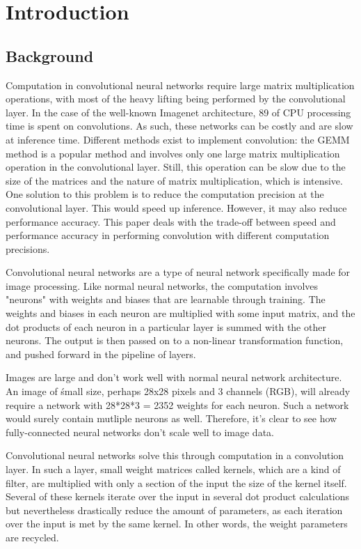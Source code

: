 \chapter{Introduction}

\section{Background}
    
Computation in convolutional neural networks require large matrix multiplication operations, with most of the heavy lifting being performed by the convolutional layer. In the case of the well-known Imagenet architecture, 89 of CPU processing time is spent on convolutions. As such, these networks can be costly and are slow at inference time. Different methods exist to implement convolution: the GEMM method is a popular method and involves only one large matrix multiplication operation in the convolutional layer. Still, this operation can be slow due to the size of the matrices and the nature of matrix multiplication, which is intensive. One solution to this problem is to reduce the computation precision at the convolutional layer. This would speed up inference. However, it may also reduce performance accuracy. This paper deals with the trade-off between speed and performance accuracy in performing convolution with different computation precisions.

Convolutional neural networks are a type of neural network specifically made for image processing. Like normal neural networks, the computation involves "neurons" with weights and biases that are learnable through training. The weights and biases in each neuron are multiplied with some input matrix, and the dot products of each neuron in a particular layer is summed with the other neurons. The output is then passed on to a non-linear transformation function, and pushed forward in the pipeline of layers.

Images are large and don't work well with normal neural network architecture. An image of śmall size, perhaps 28x28 pixels and 3 channels (RGB), will already require a network with 28*28*3 = 2352 weights for each neuron. Such a network would surely contain mutliple neurons as well. Therefore, it's clear to see how fully-connected neural networks don't scale well to image data.

Convolutional neural networks solve this through computation in a convolution layer. In such a layer, small weight matrices called kernels, which are a kind of filter, are multiplied with only a section of the input the size of the kernel itself. Several of these kernels iterate over the input in several dot product calculations but nevertheless drastically reduce the amount of parameters, as each iteration over the input is met by the same kernel. In other words, the weight parameters are recycled.

